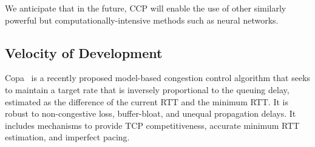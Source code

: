We anticipate that in the future, CCP will enable the use of other similarly powerful but computationally-intensive methods such as neural networks.






\subsection{Velocity of Development}
\label{s:capabilities:velocity}

Copa~\cite{copa} is a recently proposed model-based congestion control algorithm that seeks to maintain a target rate that is inversely proportional to the queuing delay, estimated as the difference of the current RTT and the minimum RTT.
It is robust to non-congestive loss, buffer-bloat, and unequal propagation delays. It includes mechanisms to provide TCP competitiveness, accurate minimum RTT estimation, and imperfect pacing.

